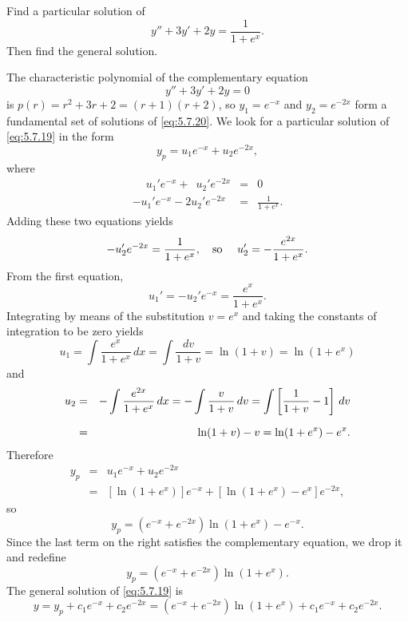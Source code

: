 \begin{example}
  \label{example:5.7.3} \rm Find a particular solution of
  \begin{equation}
    \label{eq:5.7.19}y''+3y'+2y=\frac{1}{1+e^{x}}.
  \end{equation}
  Then find the general solution.
\end{example}

\begin{examplesolution}
\solution

The characteristic polynomial of the complementary equation
\begin{equation}
  \label{eq:5.7.20}y''+3y'+2y=0
\end{equation}
is $p(r)=r^{2}+3r+2=(r+1)(r+2)$, so $y_{1}=e^{-x}$ and $y_{2}=e^{-2x}$ form a fundamental set of
solutions of \eqref{eq:5.7.20}. We look for a particular solution of \eqref{eq:5.7.19} in the form
\[
  y_{p}=u_{1}e^{-x}+u_{2}e^{-2x},
\]
where
\begin{eqnarray*}
  \phantom{-}u_{1}'e^{-x}+\phantom{2}u_{2}'e^{-2x} & = & 0 \\
  -u_{1}'e^{-x}-2u_{2}'e^{-2x}                     & = & \frac{1}{1+e^{x}}.
\end{eqnarray*}
Adding these two equations yields
\[
  -u_{2}'e^{-2x}=\frac{1}{1+e^{x}},\mbox{\quad so \quad}u_{2}'=-\frac{e^{2x}}{1+e^{x}}.
\]
From the first equation,
\[
  u_{1}'=-u_{2}'e^{-x}=\frac{e^{x}}{1+e^{x}}.
\]
Integrating by means of the substitution $v=e^{x}$ and taking the constants of integration to be
zero yields
\[
  u_{1}=\int\frac{e^{x}}{1+e^{x}}\,dx=\int\frac{dv}{1+v}=\ln(1+v)=\ln(1+e^{x})
\]
and
\begin{eqnarray*}
  u_{2} & = & -\int\frac{e^{2x}}{1+e^{x}}\,dx=-\int\frac{v}{1+v}\,dv=\int\left[\frac{1}{1+v}-1\right]\,dv \\[2\jot]
        & = & \ln(1+v)-v=\ln(1+e^{x})-e^{x}.
\end{eqnarray*}
Therefore
\begin{eqnarray*}
  y_{p} & = & u_{1}e^{-x}+u_{2}e^{-2x} \\
        & = & [\ln(1+e^{x})]e^{-x}+\left[\ln(1+e^{x})-e^{x}\right]e^{-2x},
\end{eqnarray*}
so
\[
  y_{p}=\left(e^{-x}+e^{-2x}\right)\ln(1+e^{x})-e^{-x}.
\]
Since the last term on the right satisfies the complementary equation, we drop it and redefine
\[
  y_{p}=\left(e^{-x}+e^{-2x}\right)\ln(1+e^{x}).
\]
The general solution of \eqref{eq:5.7.19} is
\[
  y=y_{p}+c_{1}e^{-x}+c_{2}e^{-2x}=\left(e^{-x}+e^{-2x}\right)\ln(1+e^{x}) +c_{1}e^{-x}+c_{2}e^{-2x}.
\]
\end{examplesolution}

